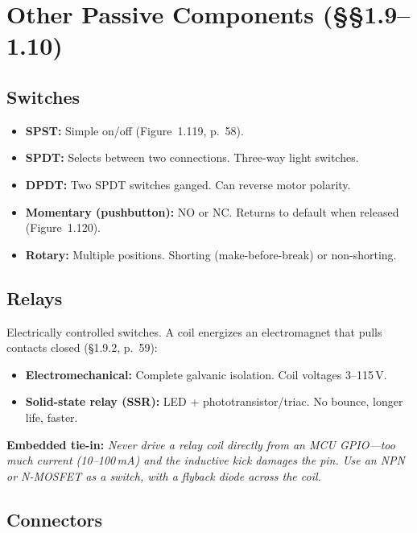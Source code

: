\documentclass[11pt,a4paper]{article}
\newcommand{\embedded}[1]{\par\textcolor{embed}{\textbf{Embedded tie-in:}} \textit{#1}}
\begin{document}
\section{Other Passive Components (\S\S1.9--1.10)}

\subsection{Switches}

\begin{itemize}[nosep]
\item \textbf{SPST:} Simple on/off (Figure~1.119, p.~58).
\item \textbf{SPDT:} Selects between two connections. Three-way light switches.
\item \textbf{DPDT:} Two SPDT switches ganged. Can reverse motor polarity.
\item \textbf{Momentary (pushbutton):} NO or NC. Returns to default when released (Figure~1.120).
\item \textbf{Rotary:} Multiple positions. Shorting (make-before-break) or non-shorting.
\end{itemize}

\subsection{Relays}

Electrically controlled switches. A coil energizes an electromagnet that pulls contacts closed (\S1.9.2, p.~59):

\begin{itemize}[nosep]
\item \textbf{Electromechanical:} Complete galvanic isolation. Coil voltages 3--115\,V.
\item \textbf{Solid-state relay (SSR):} LED + phototransistor/triac. No bounce, longer life, faster.
\end{itemize}

\embedded{Never drive a relay coil directly from an MCU GPIO---too much current (10--100\,mA) and the inductive kick damages the pin. Use an NPN or N-MOSFET as a switch, with a flyback diode across the coil.}

\subsection{Connectors}
\end{document}
